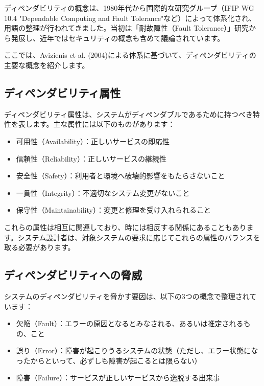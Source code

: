 ディペンダビリティの概念は、1980年代から国際的な研究グループ（IFIP WG 10.4 "Dependable Computing and Fault Tolerance"など）によって体系化され、用語の整理が行われてきました。当初は「耐故障性（Fault Tolerance）」研究から発展し、近年ではセキュリティの概念も含めて議論されています。

ここでは、Avizienis et al. (2004)による体系に基づいて、ディペンダビリティの主要な概念を紹介します。

\subsection{ディペンダビリティ属性}

ディペンダビリティ属性は、システムがディペンダブルであるために持つべき特性を表します。主な属性には以下のものがあります：

\begin{itemize}
\item 可用性（Availability）：正しいサービスの即応性
\item 信頼性（Reliability）：正しいサービスの継続性
\item 安全性（Safety）：利用者と環境へ破壊的影響をもたらさないこと
\item 一貫性（Integrity）：不適切なシステム変更がないこと
\item 保守性（Maintainability）：変更と修理を受け入れられること
\end{itemize}

これらの属性は相互に関連しており、時には相反する関係にあることもあります。システム設計者は、対象システムの要求に応じてこれらの属性のバランスを取る必要があります。

\subsection{ディペンダビリティへの脅威}

システムのディペンダビリティを脅かす要因は、以下の3つの概念で整理されています：

\begin{itemize}
\item 欠陥（Fault）：エラーの原因となるとみなされる、あるいは推定されるもの、こと
\item 誤り（Error）：障害が起こりうるシステムの状態（ただし、エラー状態になったからといって、必ずしも障害が起こるとは限らない）
\item 障害（Failure）：サービスが正しいサービスから逸脱する出来事
\end{itemize}

